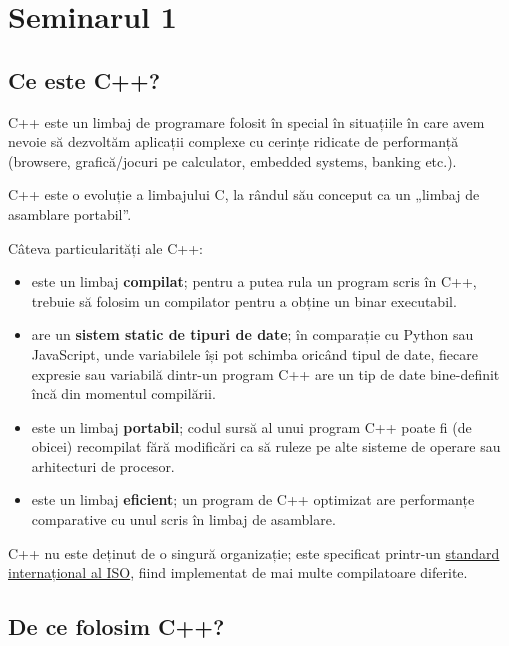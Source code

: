 \section*{Seminarul 1}

\subsection*{Ce este C++?}

C++ este un limbaj de programare folosit în special în situațiile în care avem nevoie să dezvoltăm aplicații complexe cu cerințe ridicate de performanță (browsere, grafică/jocuri pe calculator, embedded systems, banking etc.).

C++ este o evoluție a limbajului C, la rândul său conceput ca un „limbaj de asamblare portabil”.

Câteva particularități ale C++:
\begin{itemize}

    \item este un limbaj \textbf{compilat}; pentru a putea rula un program scris în C++, trebuie să folosim un compilator pentru a obține un binar executabil.

    \item are un \textbf{sistem static de tipuri de date}; în comparație cu Python sau JavaScript, unde variabilele își pot schimba oricând tipul de date, fiecare expresie sau variabilă dintr-un program C++ are un tip de date bine-definit încă din momentul compilării.

    \item este un limbaj \textbf{portabil}; codul sursă al unui program C++ poate fi (de obicei) recompilat fără modificări ca să ruleze pe alte sisteme de operare sau arhitecturi de procesor.

    \item este un limbaj \textbf{eficient}; un program de C++ optimizat are performanțe comparative cu unul scris în limbaj de asamblare.
\end{itemize}

C++ nu este deținut de o singură organizație; este specificat printr-un \href{https://isocpp.org/std/the-standard}{standard internațional al ISO}, fiind implementat de mai multe compilatoare diferite.

\subsection*{De ce folosim C++?}

